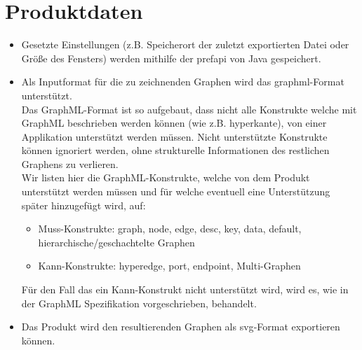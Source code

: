 \chapter{Produktdaten}\label{ch:daten}

\begin{itemize}
  \item Gesetzte Einstellungen (z.B. Speicherort der zuletzt exportierten Datei oder Größe des Fensters) werden mithilfe der \gls{prefapi} von Java gespeichert.
  \item Als Inputformat für die zu zeichnenden Graphen wird das \gls{graphml}-Format unterstützt.\\
    Das GraphML-Format ist so aufgebaut, dass nicht alle Konstrukte welche mit GraphML beschrieben werden können (wie z.B. \gls{hyperkante}),
    von einer Applikation unterstützt werden müssen.
    Nicht unterstützte Konstrukte können ignoriert werden, ohne strukturelle Informationen des restlichen Graphens zu verlieren.\\
    Wir listen hier die GraphML-Konstrukte, welche von dem Produkt unterstützt werden müssen und für welche eventuell eine Unterstützung später hinzugefügt wird, auf:
    \begin{itemize}
      \item Muss-Konstrukte: graph, node, edge, desc, key, data, default, hierarchische/geschachtelte Graphen  %
      \item Kann-Konstrukte: hyperedge, port, endpoint, Multi-Graphen
    \end{itemize}
    Für den Fall das ein Kann-Konstrukt nicht unterstützt wird, wird es, wie in der GraphML Spezifikation vorgeschrieben, behandelt.
  \item Das Produkt wird den resultierenden Graphen als \gls{svg}-Format exportieren können.
\end{itemize}

